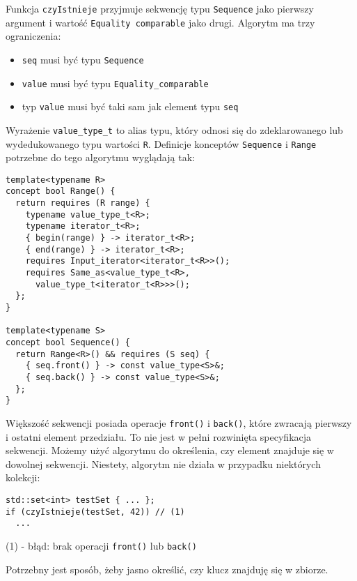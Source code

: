 \documentclass[11pt, a4paper]{article}
\begin{document}
\noindent Funkcja \verb#czyIstnieje# przyjmuje sekwencję typu \verb#Sequence# jako pierwszy argument i wartość \verb#Equality comparable# jako drugi. Algorytm ma trzy ograniczenia:

\begin{itemize}

\item \verb#seq# musi być typu \verb#Sequence#
\item \verb#value# musi być typu \verb#Equality_comparable#
\item typ \verb#value# musi być taki sam jak element typu \verb#seq#

\end{itemize}

\noindent Wyrażenie \verb#value_type_t# to alias typu, który odnosi się do zdeklarowanego lub wydedukowanego typu wartości \verb#R#. Definicje konceptów \verb#Sequence# i \verb#Range# potrzebne do tego algorytmu wyglądają tak: \newline

\begin{lstlisting}[frame=single]
template<typename R>
concept bool Range() {
  return requires (R range) {
    typename value_type_t<R>;
    typename iterator_t<R>;
    { begin(range) } -> iterator_t<R>;
    { end(range) } -> iterator_t<R>;
    requires Input_iterator<iterator_t<R>>();
    requires Same_as<value_type_t<R>,
      value_type_t<iterator_t<R>>>();
  };
}

template<typename S>
concept bool Sequence() {
  return Range<R>() && requires (S seq) {
    { seq.front() } -> const value_type<S>&;
    { seq.back() } -> const value_type<S>&;
  };
}
\end{lstlisting}

Większość sekwencji posiada operacje \verb#front()# i \verb#back()#, które zwracają pierwszy i ostatni element przedziału. To nie jest w pełni rozwinięta specyfikacja sekwencji. Możemy użyć algorytmu do określenia, czy element znajduje się w dowolnej sekwencji. Niestety, algorytm nie działa w przypadku niektórych kolekcji:

\begin{lstlisting}[frame=single]
std::set<int> testSet { ... };
if (czyIstnieje(testSet, 42)) // (1)
  ...
\end{lstlisting}

(1) - błąd: brak operacji \verb#front()# lub \verb#back()#\newline

Potrzebny jest sposób, żeby jasno określić, czy klucz znajduję się w zbiorze.

\end{document}
